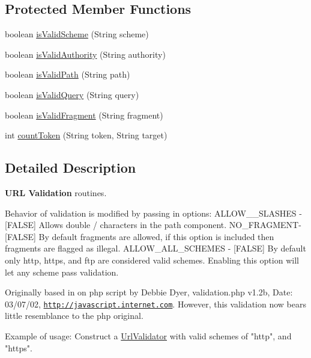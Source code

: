 \subsection*{Protected Member Functions}
\begin{DoxyCompactItemize}
\item 
boolean \hyperlink{classUrlValidator_a9a598e3ca397702e2a36033965993fc7}{is\+Valid\+Scheme} (String scheme)
\item 
boolean \hyperlink{classUrlValidator_aeeb764937709a459010e4db60fe70e59}{is\+Valid\+Authority} (String authority)
\item 
boolean \hyperlink{classUrlValidator_ab0c296806ab80aa80d98e9654d791b05}{is\+Valid\+Path} (String path)
\item 
boolean \hyperlink{classUrlValidator_a509b2d886b639de2b1c55e6e3707ba5f}{is\+Valid\+Query} (String query)
\item 
boolean \hyperlink{classUrlValidator_ac8fbdf3595973d4a9cebc1bf95c81656}{is\+Valid\+Fragment} (String fragment)
\item 
int \hyperlink{classUrlValidator_a80666c758d0f6ef10b8e3039905c28de}{count\+Token} (String token, String target)
\end{DoxyCompactItemize}


\subsection{Detailed Description}
{\bfseries U\+RL Validation} routines.

Behavior of validation is modified by passing in options\+: A\+L\+L\+O\+W\+\_\+\_\+\+S\+L\+A\+S\+H\+ES -\/ \mbox{[}F\+A\+L\+SE\mbox{]} Allows double \textquotesingle{}/\textquotesingle{} characters in the path component. N\+O\+\_\+\+F\+R\+A\+G\+M\+E\+N\+T-\/ \mbox{[}F\+A\+L\+SE\mbox{]} By default fragments are allowed, if this option is included then fragments are flagged as illegal. A\+L\+L\+O\+W\+\_\+\+A\+L\+L\+\_\+\+S\+C\+H\+E\+M\+ES -\/ \mbox{[}F\+A\+L\+SE\mbox{]} By default only http, https, and ftp are considered valid schemes. Enabling this option will let any scheme pass validation.

Originally based in on php script by Debbie Dyer, validation.\+php v1.\+2b, Date\+: 03/07/02, \href{http://javascript.internet.com}{\tt http\+://javascript.\+internet.\+com}. However, this validation now bears little resemblance to the php original.


\begin{DoxyPre}
  Example of usage:
  Construct a \hyperlink{classUrlValidator}{UrlValidator} with valid schemes of "http", and "https".\end{DoxyPre}




